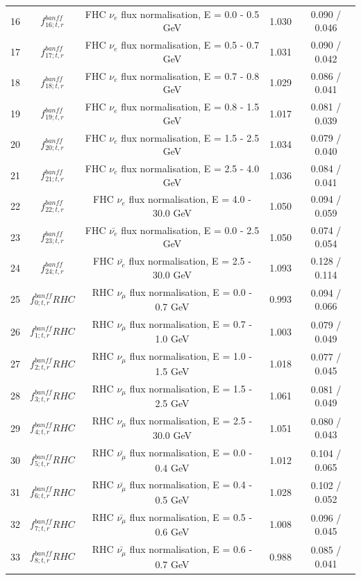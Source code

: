 \begin{tabular} { | c | c | c | c | c |  }
16 & $f_{16; t, r}^{banff}$ & FHC $\nu_e$ flux normalisation, E = 0.0 - 0.5 GeV & 1.030 & 0.090 / 0.046\\ 
17 & $f_{17; t, r}^{banff}$ & FHC $\nu_e$ flux normalisation, E = 0.5 - 0.7 GeV & 1.031 & 0.090 / 0.042\\ 
18 & $f_{18; t, r}^{banff}$ & FHC $\nu_e$ flux normalisation, E = 0.7 - 0.8 GeV & 1.029 & 0.086 / 0.041\\ 
19 & $f_{19; t, r}^{banff}$ & FHC $\nu_e$ flux normalisation, E = 0.8 - 1.5 GeV & 1.017 & 0.081 / 0.039\\ 
20 & $f_{20; t, r}^{banff}$ & FHC $\nu_e$ flux normalisation, E = 1.5 - 2.5 GeV & 1.034 & 0.079 / 0.040\\ 
21 & $f_{21; t, r}^{banff}$ & FHC $\nu_e$ flux normalisation, E = 2.5 - 4.0 GeV & 1.036 & 0.084 / 0.041\\ 
22 & $f_{22; t, r}^{banff}$ & FHC $\nu_e$ flux normalisation, E = 4.0 - 30.0 GeV & 1.050 & 0.094 / 0.059\\ 
23 & $f_{23; t, r}^{banff}$ & FHC $\bar{\nu_e}$ flux normalisation, E = 0.0 - 2.5 GeV & 1.050 & 0.074 / 0.054\\ 
24 & $f_{24; t, r}^{banff}$ & FHC $\bar{\nu_e}$ flux normalisation, E = 2.5 - 30.0 GeV & 1.093 & 0.128 / 0.114\\ 
25 & $f_{0; t, r}^{banff} RHC$ & RHC $\nu_\mu$ flux normalisation, E = 0.0 - 0.7 GeV & 0.993 & 0.094 / 0.066\\ 
26 & $f_{1; t, r}^{banff} RHC$ & RHC $\nu_\mu$ flux normalisation, E = 0.7 - 1.0 GeV & 1.003 & 0.079 / 0.049\\ 
27 & $f_{2; t, r}^{banff} RHC$ & RHC $\nu_\mu$ flux normalisation, E = 1.0 - 1.5 GeV & 1.018 & 0.077 / 0.045\\ 
28 & $f_{3; t, r}^{banff} RHC$ & RHC $\nu_\mu$ flux normalisation, E = 1.5 - 2.5 GeV & 1.061 & 0.081 / 0.049\\ 
29 & $f_{4; t, r}^{banff} RHC$ & RHC $\nu_\mu$ flux normalisation, E = 2.5 - 30.0 GeV & 1.051 & 0.080 / 0.043\\ 
30 & $f_{5; t, r}^{banff} RHC$ & RHC $\bar{\nu_\mu}$ flux normalisation, E = 0.0 - 0.4 GeV & 1.012 & 0.104 / 0.065\\ 
31 & $f_{6; t, r}^{banff} RHC$ & RHC $\bar{\nu_\mu}$ flux normalisation, E = 0.4 - 0.5 GeV & 1.028 & 0.102 / 0.052\\ 
32 & $f_{7; t, r}^{banff} RHC$ & RHC $\bar{\nu_\mu}$ flux normalisation, E = 0.5 - 0.6 GeV & 1.008 & 0.096 / 0.045\\ 
33 & $f_{8; t, r}^{banff} RHC$ & RHC $\bar{\nu_\mu}$ flux normalisation, E = 0.6 - 0.7 GeV & 0.988 & 0.085 / 0.041\\ 

\end{tabular}
